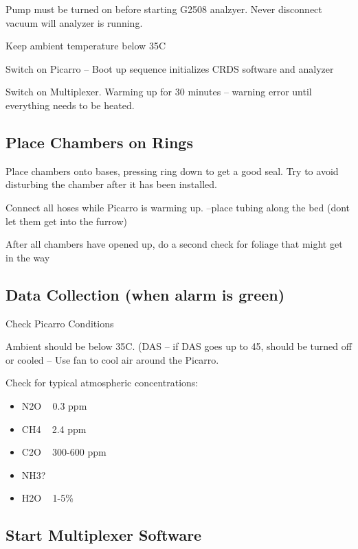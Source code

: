 \documentclass[12pt]{../SOP3}\usepackage[]{graphicx}\usepackage[]{color}
\begin{document}
\NP Pump must be turned on before starting G2508 analzyer. Never disconnect vacuum will analyzer is running.

\NP Keep ambient temperature below 35\degree C

\NP Switch on Picarro  -- Boot up sequence initializes CRDS software and analyzer

\NP Switch on Multiplexer. Warming up for 30 minutes -- warning error until everything needs to be heated.

\subsection*{Place Chambers on Rings}

\NP Place chambers onto bases, pressing ring down to get a good seal. Try to avoid disturbing the chamber after it has been installed. 

\NP Connect all hoses while Picarro is warming up. --place tubing along the bed (dont let them get into the furrow)

\NP After all chambers have opened up, do a second check for foliage that might get in the way

\subsection*{Data Collection (when alarm is green)}

\NP Check Picarro Conditions

\NP Ambient should be below 35\degree C. (DAS -- if DAS goes up to 45\degree, should be turned off or cooled -- Use fan to cool air around the Picarro.
                               
\NP Check for typical atmospheric concentrations:
                                 
\begin{itemize}
\item N2O ~ 0.3 ppm
\item CH4 ~ 2.4 ppm
\item C2O ~ 300-600 ppm
\item NH3?
\item H2O ~ 1-5\%
\end{itemize}
                               
\subsection*{Start Multiplexer Software}
\end{document}
